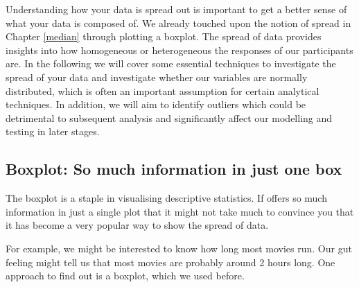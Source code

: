 \documentclass[
]{book}
\begin{document}
Understanding how your data is spread out is important to get a better sense of what your data is composed of. We already touched upon the notion of spread in Chapter \ref{median} through plotting a boxplot. The spread of data provides insights into how homogeneous or heterogeneous the responses of our participants are. In the following we will cover some essential techniques to investigate the spread of your data and investigate whether our variables are normally distributed, which is often an important assumption for certain analytical techniques. In addition, we will aim to identify outliers which could be detrimental to subsequent analysis and significantly affect our modelling and testing in later stages.

\hypertarget{boxplot-so-much-information-in-just-one-box}{%
\subsection{Boxplot: So much information in just one box}\label{boxplot-so-much-information-in-just-one-box}}

The boxplot is a staple in visualising descriptive statistics. If offers so much information in just a single plot that it might not take much to convince you that it has become a very popular way to show the spread of data.

For example, we might be interested to know how long most movies run. Our gut feeling might tell us that most movies are probably around 2 hours long. One approach to find out is a boxplot, which we used before.
\end{document}
